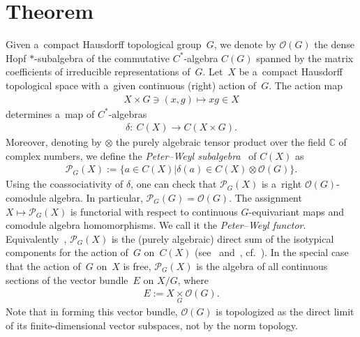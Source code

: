 \documentclass[pdftex]{sigma}
\begin{document}



\renewcommand{\thefootnote}{\arabic{footnote}} \setcounter{footnote}{0}

\section{Theorem}

Given a~compact Hausdorf\/f topological group~$G$, we denote by ${\mathcal O} (G)$ the dense Hopf $*$-subalgebra of the
commutative $C^{*}$-algebra $C(G)$ spanned by the matrix coef\/f\/icients of irreducible representations of~$G$.
Let~$X$ be a~compact Hausdorf\/f topological space with a~given continuous (right) action of~$G$.
The action map
\begin{gather*}
X\times G\ni (x,g)\longmapsto xg\in X
\end{gather*}
determines a~map of $C^{*}$-algebras
\begin{gather*}
\delta\colon \  C(X)\longrightarrow C(X\times G).
\end{gather*}
Moreover, denoting by $\otimes$ the purely algebraic tensor product over the f\/ield $\mathbb{C}$ of complex numbers, we
def\/ine the \emph{Peter--Weyl subalgebra}~\cite[(3.1.4)]{bhms} of $C(X)$ as
\begin{gather*}
\mathcal{P}_G(X):=\{a\in C(X)| \delta(a)\in C(X)\otimes{\mathcal O}(G)\}.
\end{gather*}
Using the coassociativity of $\delta$, one can check that $\mathcal{P}_G(X)$ is a~right ${\mathcal O} (G)$-comodule algebra.
In particular, $\mathcal{P}_G(G)={\mathcal O}(G)$.
The assignment $X\mapsto\mathcal{P}_G(X)$ is functorial with respect to continuous $G$-equivariant maps and comodule algebra homomorphisms.
We call it the \emph{Peter--Weyl functor}.
Equivalently~\cite[Proposition 2.2]{s-pm11}, $\mathcal{P}_G(X)$ is the (purely algebraic) direct sum of the isotypical
components for the action of~$G$ on~$C(X)$ (see~\cite[p.~31]{m-gd61} and~\cite{l-lh53}, cf.~\cite[Theorem~1.5.1]{p-p95}).
In the special case that the action of~$G$ on~$X$ is free, $\mathcal{P}_{G}(X)$ is the algebra of all continuous
sections of the vector bundle~$E$ on $X/G$, where
\begin{gather}\label{vecbun}
E:= X\underset{G}{\times}{\mathcal O}(G).
\end{gather}
Note that in forming this vector bundle, ${\mathcal O}(G)$ is topologized as the direct limit of its f\/inite-dimensional
vector subspaces, not by the norm topology.
\end{document}

